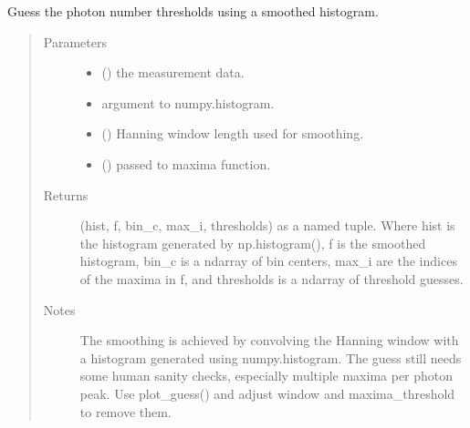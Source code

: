 \documentclass[letterpaper,10pt,english]{sphinxmanual}
\begin{document}
\begin{fulllineitems}
\label{\detokenize{tes:tes.analysis.guess_thresholds}}
\sphinxAtStartPar
Guess the photon number thresholds using a smoothed histogram.
\begin{quote}\begin{description}
\item[{Parameters}] \leavevmode\begin{itemize}
\item {} 
\sphinxAtStartPar
{} () \textendash{} the measurement data.

\item {} 
\sphinxAtStartPar
{} \textendash{} argument to numpy.histogram.

\item {} 
\sphinxAtStartPar
{} () \textendash{} Hanning window length used for smoothing.

\item {} 
\sphinxAtStartPar
{} () \textendash{} passed to maxima function.

\end{itemize}

\item[{Returns}] \leavevmode
\sphinxAtStartPar
(hist, f, bin\_c, max\_i, thresholds) as a named
tuple. Where hist is the histogram
generated by np.histogram(), f is the smoothed histogram, bin\_c is a
ndarray of bin centers, max\_i are the indices of the maxima in f,
and thresholds is a ndarray of threshold guesses.

\item[{Notes}] \leavevmode
\sphinxAtStartPar
The smoothing is achieved by convolving the Hanning window with a
histogram generated using numpy.histogram. The guess still needs
some human sanity checks, especially multiple maxima per photon
peak. Use plot\_guess() and adjust window and maxima\_threshold to
remove them.

\end{description}\end{quote}

\end{fulllineitems}
\end{document}
